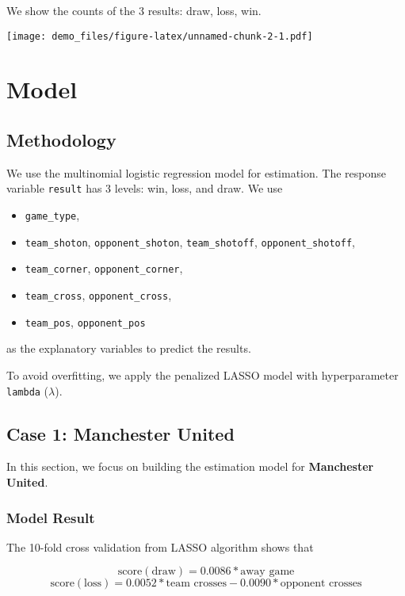 \documentclass[]{book}
\providecommand{\tightlist}{%
  \setlength{\itemsep}{0pt}\setlength{\parskip}{0pt}}
\theoremstyle{definition}
\theoremstyle{definition}
\theoremstyle{definition}
\theoremstyle{remark}
\begin{document}
We show the counts of the 3 results: draw, loss, win.

\texttt{[image: demo\_files/figure-latex/unnamed-chunk-2-1.pdf]}

\chapter{Model}\label{model}

\section{Methodology}\label{methodology}

We use the multinomial logistic regression model for estimation. The
response variable \texttt{result} has 3 levels: win, loss, and draw. We
use

\begin{itemize}
\tightlist
\item
  \texttt{game\_type},
\item
  \texttt{team\_shoton}, \texttt{opponent\_shoton},
  \texttt{team\_shotoff}, \texttt{opponent\_shotoff},
\item
  \texttt{team\_corner}, \texttt{opponent\_corner},
\item
  \texttt{team\_cross}, \texttt{opponent\_cross},
\item
  \texttt{team\_pos}, \texttt{opponent\_pos}
\end{itemize}

as the explanatory variables to predict the results.

To avoid overfitting, we apply the penalized LASSO model with
hyperparameter \texttt{lambda} (\(\lambda\)).

\section{Case 1: Manchester United}\label{case-1-manchester-united}

In this section, we focus on building the estimation model for
\textbf{Manchester United}.

\subsection{Model Result}\label{model-result}

The 10-fold cross validation from LASSO algorithm shows that

\[ \text{score}(\text{draw}) = 0.0086 * \text{away game} \]
\[ \text{score}(\text{loss}) = 0.0052 * \text{team crosses} - 0.0090 * \text{opponent crosses} \]
\end{document}

